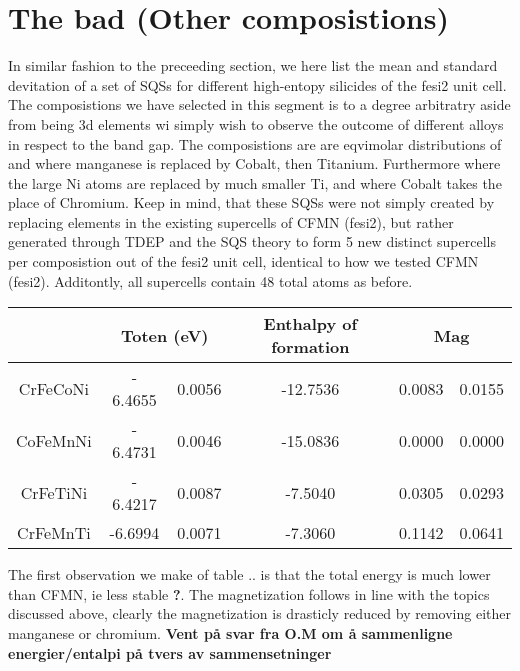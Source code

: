 \chapter{The bad (Other composistions)}
\label{sec:bad}

In similar fashion to the preceeding section, we here list the mean and standard devitation of a set of SQSs for different high-entopy silicides of the fesi2 unit cell. The composistions we have selected in this segment is to a degree arbitratry aside from being 3d elements wi simply wish to observe the outcome of different alloys in respect to the band gap. The composistions are
are eqvimolar distributions of  and  where manganese is replaced by Cobalt, then Titanium. Furthermore  where the large Ni atoms are replaced by much smaller Ti, and  where Cobalt takes the place of Chromium. Keep in mind, that these SQSs were not simply created by replacing elements in the existing supercells of CFMN (fesi2), but rather generated through TDEP and the SQS theory to form 5 new distinct supercells per composistion out of the fesi2 unit cell, identical to how we tested CFMN (fesi2). Additontly, all supercells contain 48 total atoms as before.  

\begin{table}[h!]
\centering
\begin{tabular}{@{}cccccc@{}}
\toprule
         & \multicolumn{2}{c}{Toten (eV)} & Enthalpy of formation &  \multicolumn{2}{c}{Mag} \\ \midrule
CrFeCoNi & - 6.4655        & 0.0056     & -12.7536       & 0.0083     & 0.0155     \\
CoFeMnNi & - 6.4731        & 0.0046     & -15.0836       & 0.0000    & 0.0000          \\
CrFeTiNi & - 6.4217        & 0.0087     & -7.5040       & 0.0305     & 0.0293     \\
CrFeMnTi & -6.6994         & 0.0071     & -7.3060       & 0.1142     & 0.0641     \\ \bottomrule
\end{tabular}
\end{table}

The first observation we make of table .. is that the total energy is much lower than CFMN, ie less stable \textbf{?}. The magnetization follows in line with the topics discussed above, clearly the magnetization is drasticly reduced by removing either manganese or chromium. \textbf{Vent på svar fra O.M om å sammenligne energier/entalpi på tvers av sammensetninger}   

